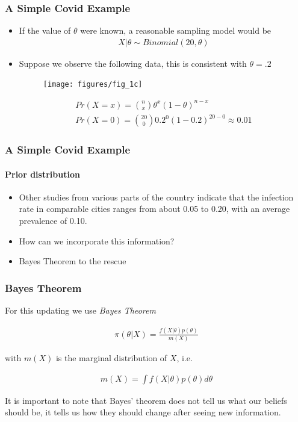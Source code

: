\documentclass[
  shownotes,
  xcolor={svgnames},
  hyperref={colorlinks,citecolor=DarkBlue,linkcolor=DarkRed,urlcolor=DarkBlue}
  , aspectratio=169]{beamer}
\begin{document}
\begin{frame}[fragile]
\frametitle{A Simple Covid Example}

\begin{itemize}
\footnotesize
 \item If the value of $\theta$ were known, a reasonable sampling model would be
 \begin{align}
 X|\theta \sim Binomial(20,\theta)
 \end{align}

 \item Suppose we observe the following data, this is consistent with $\theta=.2$
 \begin{figure}[H] \centering
  \centering
  \texttt{[image: figures/fig\_1c]}
  \\
  \tiny 
\end{figure}

\tiny
 \begin{align}
 Pr(X=x)= \binom{n}{x}\theta^x(1-\theta)^{n-x} \\
 Pr(X=0)= \binom{20}{0}0.2^0(1-0.2)^{20-0} \approx 0.01
 \end{align}
\end{itemize}


\end{frame}
\begin{frame}[fragile]
\frametitle{A Simple Covid Example}
\framesubtitle{Prior distribution}

\begin{itemize}
\item Other studies from various parts of the country indicate that the infection rate in comparable cities ranges from about 0.05 to 0.20, with an average prevalence of 0.10.

\medskip
\item How can we incorporate this information?
\medskip

\item Bayes Theorem to the rescue
\end{itemize}



\end{frame}
\begin{frame}[fragile]
\frametitle{Bayes Theorem}
For this updating we use {\it Bayes Theorem}

\bigskip
\begin{align}
\pi (\theta|X)=\frac{f(X|\theta)p(\theta)}{m(X)}
\end{align}

\bigskip
with $m(X)$ is the marginal distribution of $X$, i.e.

\begin{align}
m(X)=\int f(X|\theta)p(\theta)d\theta
\end{align}

It is important to note that Bayes' theorem  does not tell us what our beliefs should be, it tells us how they should change after seeing new information.
\end{frame}
\end{document}
